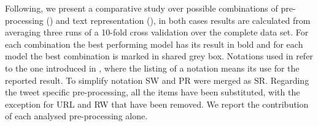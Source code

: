 Following, we present a comparative study over possible combinations of pre-processing () and text representation (), in both cases results are calculated from averaging three runs of a 10-fold cross validation over the complete data set. For each combination the best performing model has its result in bold and for each model the best combination is marked in shared grey box.
Notations used in  refer to the one introduced in , where the listing of a notation means its use for the reported result. To simplify notation SW and PR were merged as SR.
Regarding the tweet specific pre-processing, all the items have been substituted, with the exception for URL and RW that have been removed. We report the contribution of each analysed pre-processing alone.


\begin{comment}
\begin{table}[h]
\footnotesize
\caption{Pre-processing study comparing 10-fold cross validation results over the development set in terms of percentuage of $F_{1-macro}$ score. }
\centering
\begin{tabular}{l|ccccc}
\toprule
\multirow{2}{*}{Preprocessing}	& \multicolumn{5}{ c }{Models}       \\ 
& CNN		& LSTM		& B-LSTM	& FAST-TEXT	& KIM	\\ 
\hline 
Nothing					& 50,5     & 55,6		& 51,1		& 53,0 		& \textbf{55,8}	\\ 
\hline 
ST						& 49,6		& 49,9		& 47,5		& \textbf{53,1}	& \textbf{53,1}	\\ 
ST+SR					& 47,6		& \textbf{55,3}	& 47,6		& 52,9		& 51,1	\\ 
ST+SR+RM				& 51,9		& \win\textbf{56,8}		& 52,2		& 56,0		& 50,8	\\ 
ST+SR+RM+MT				& 54,6		& \textbf{56,1}		& 47,7		& 54,6		& 53,6	\\ 
ST+SR+RM+MT+NUM			& 53,2		& \textbf{55,5}		& 51,0		& 53,4		& 51,5 \\ 
ST+SR+RM+MT+NUM+EM+SM	& 52,7		& \textbf{56,4}		& 53,7		& 54,2		& 51,8 \\ 
ST+SR+RM+MT+NUM+EM+SM+HT& 55,1		& 54,0		& 52,9		& \textbf{56,7}		& 51,1 \\ 
\hline
SR+RM+MT+NUM+EM+SM		& 54,5		& 54,8		& 53,9		& \win\textbf{57,0}		& 54,8 \\ 
\hline
RM						& 55,9		& 43,4		& 48,5		& 56,5		& \textbf{57,7} \\ 
RM+EM+SM				& \win57,1		& 52,1		& 49,9		& 54,8		& \win\textbf{58,9} \\
RM+MT+NUM+EM+SM			& 54,3		& 54,6		& \win55,5		& \textbf{56,8}		& 54,8 \\ 
\bottomrule
\end{tabular}
\end{table}
\end{comment}

